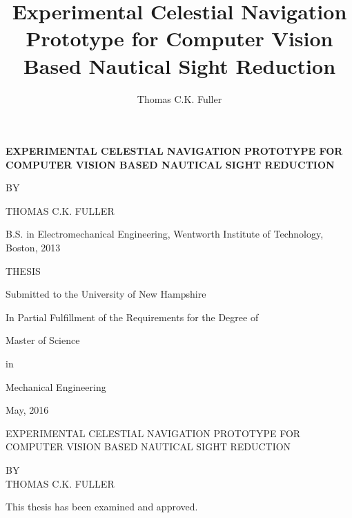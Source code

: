 \documentclass[12pt,a4paper]{book}
\author{Thomas C.K. Fuller}
\title{Experimental Celestial Navigation Prototype for Computer Vision Based Nautical Sight Reduction}
\begin{document}
\begin{titlepage}
	\centering
	{\scshape\large \textbf{EXPERIMENTAL CELESTIAL NAVIGATION PROTOTYPE FOR COMPUTER VISION BASED NAUTICAL SIGHT REDUCTION}\par}
	\vspace{1.75cm}
	{\scshape\normalsize BY\par}
	\vspace{2.25cm}
	{\normalsize THOMAS C.K. FULLER\par}
	{\normalsize B.S. in Electromechanical Engineering, Wentworth Institute of Technology, Boston, 2013\par}
	
	\vspace{2cm}
	{\normalsize THESIS\par}
	\vspace{2.5cm}
	{\normalsize Submitted to the University of New Hampshire\par}
	{\normalsize In Partial Fulfillment of the Requirements for the Degree of\par}
	{\normalsize Master of Science\par}
	{\normalsize in\par}
	{\normalsize Mechanical Engineering\par}


	\vfill

	{\normalsize May, 2016\par}
\end{titlepage}
\frontmatter
\begin{center}
EXPERIMENTAL CELESTIAL NAVIGATION PROTOTYPE FOR COMPUTER VISION BASED NAUTICAL SIGHT REDUCTION

\vspace{1cm}
{\normalsize BY}\\
{\normalsize THOMAS C.K. FULLER}
\end{center}
\vspace{2cm}
This thesis has been examined and approved.
\vspace{2cm}
\\
\hspace*{3cm}
\end{document}
